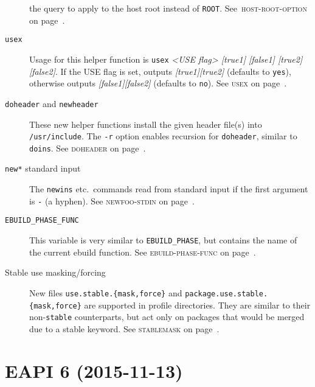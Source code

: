 \documentclass[a4paper,nofoldmark]{leaflet}
\newcommand{\code}[1]{\texttt{#1}}
\newcommand{\featureref}[1]{\textsc{#1} on page~\pageref{feat:#1}}
\begin{document}
\begin{description}
    the query to apply to the host root instead of \code{ROOT}.
    See~\featureref{host-root-option}.
    \item[\code{usex}] Usage for this helper function is
    \code{usex} \emph{<USE flag> [true1] [false1] [true2] [false2]}.
    If the USE flag is set, outputs \emph{[true1][true2]}
    (defaults to \code{yes}), otherwise outputs
    \emph{[false1][false2]} (defaults to \code{no}).
    See \featureref{usex}.
    \item[\code{doheader} and \code{newheader}] These new helper
    functions install the given header file(s) into
    \code{/usr/include}. The \code{-r} option enables recursion for
    \code{doheader}, similar to \code{doins}.
    See \featureref{doheader}.
    \item[\code{new*} standard input] The \code{newins} etc.\ commands
    read from standard input if the first argument is \code{-}
    (a hyphen).
    See \featureref{newfoo-stdin}.
    \item[\code{EBUILD_PHASE_FUNC}] This variable is very similar to
    \code{EBUILD_PHASE}, but contains the name of the current ebuild
    function.
    See \featureref{ebuild-phase-func}.
    \item[Stable use masking/forcing] New files
    \code{use.stable.\allowbreak\{mask,force\}} and
    \code{package.use.stable.\allowbreak\{mask,force\}}
    are supported in profile directories.  They are similar to their
    non-\code{stable} counterparts, but act only on packages that
    would be merged due to a stable keyword.
    See \featureref{stablemask}.
\end{description}

\section{EAPI 6 (2015-11-13)}
\label{sec:cs:eapi6}
\end{document}
